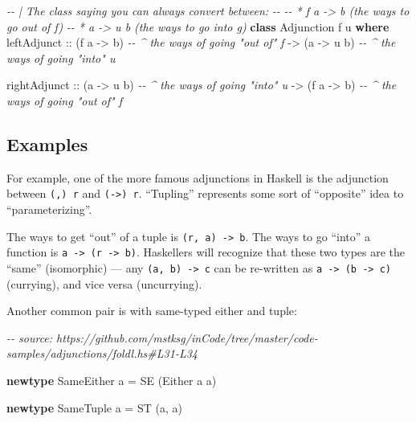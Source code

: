 \documentclass[]{article}
\newenvironment{Shaded}{}{}
\newcommand{\CommentTok}[1]{\textcolor[rgb]{0.38,0.63,0.69}{\textit{#1}}}
\newcommand{\DataTypeTok}[1]{\textcolor[rgb]{0.56,0.13,0.00}{#1}}
\newcommand{\KeywordTok}[1]{\textcolor[rgb]{0.00,0.44,0.13}{\textbf{#1}}}
\newcommand{\NormalTok}[1]{#1}
\newcommand{\OtherTok}[1]{\textcolor[rgb]{0.00,0.44,0.13}{#1}}
\begin{document}
\begin{Shaded}
\begin{Highlighting}[]
\CommentTok{{-}{-} | The class saying you can always convert between:}
\CommentTok{{-}{-}}
\CommentTok{{-}{-} * \textasciigrave{}f a {-}> b\textasciigrave{} (the ways to go out of \textasciigrave{}f\textasciigrave{})}
\CommentTok{{-}{-} * \textasciigrave{}a {-}> u b\textasciigrave{} (the ways to go into \textasciigrave{}g\textasciigrave{})}
\KeywordTok{class} \DataTypeTok{Adjunction}\NormalTok{ f u }\KeywordTok{where}
\NormalTok{    leftAdjunct}
\OtherTok{        ::}\NormalTok{ (f a }\OtherTok{{-}>}\NormalTok{ b)       }\CommentTok{{-}{-} \^{} the ways of going "out of" \textasciigrave{}f\textasciigrave{}}
        \OtherTok{{-}>}\NormalTok{ (a }\OtherTok{{-}>}\NormalTok{ u b)       }\CommentTok{{-}{-} \^{} the ways of going "into" \textasciigrave{}u\textasciigrave{}}

\NormalTok{    rightAdjunct}
\OtherTok{        ::}\NormalTok{ (a }\OtherTok{{-}>}\NormalTok{ u b)       }\CommentTok{{-}{-} \^{} the ways of going "into" u}
        \OtherTok{{-}>}\NormalTok{ (f a }\OtherTok{{-}>}\NormalTok{ b)       }\CommentTok{{-}{-} \^{} the ways of going "out of" f}
\end{Highlighting}
\end{Shaded}

\hypertarget{examples}{%
\subsection{Examples}\label{examples}}

For example, one of the more famous adjunctions in Haskell is the adjunction
between \texttt{(,)\ r} and \texttt{(-\textgreater{})\ r}. ``Tupling''
represents some sort of ``opposite'' idea to ``parameterizing''.

The ways to get ``out'' of a tuple is \texttt{(r,\ a)\ -\textgreater{}\ b}. The
ways to go ``into'' a function is
\texttt{a\ -\textgreater{}\ (r\ -\textgreater{}\ b)}. Haskellers will recognize
that these two types are the ``same'' (isomorphic) --- any
\texttt{(a,\ b)\ -\textgreater{}\ c} can be re-written as
\texttt{a\ -\textgreater{}\ (b\ -\textgreater{}\ c)} (currying), and vice versa
(uncurrying).

Another common pair is with same-typed either and tuple:

\begin{Shaded}
\begin{Highlighting}[]
\CommentTok{{-}{-} source: https://github.com/mstksg/inCode/tree/master/code{-}samples/adjunctions/foldl.hs\#L31{-}L34}

\KeywordTok{newtype} \DataTypeTok{SameEither}\NormalTok{ a }\OtherTok{=} \DataTypeTok{SE}\NormalTok{ (}\DataTypeTok{Either}\NormalTok{ a a)}

\KeywordTok{newtype} \DataTypeTok{SameTuple}\NormalTok{  a }\OtherTok{=} \DataTypeTok{ST}\NormalTok{ (a, a)}
\end{Highlighting}
\end{Shaded}
\end{document}
